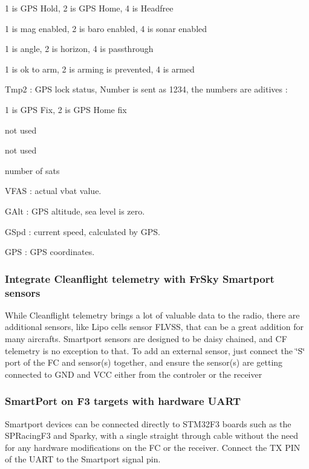 \begin{DoxyEnumerate}
\item 1 is G\+P\+S Hold, 2 is G\+P\+S Home, 4 is Headfree
\item 1 is mag enabled, 2 is baro enabled, 4 is sonar enabled
\item 1 is angle, 2 is horizon, 4 is passthrough
\item 1 is ok to arm, 2 is arming is prevented, 4 is armed
\end{DoxyEnumerate}

Tmp2 \+: G\+P\+S lock status, Number is sent as 1234, the numbers are aditives \+:


\begin{DoxyEnumerate}
\item 1 is G\+P\+S Fix, 2 is G\+P\+S Home fix
\item not used
\item not used
\item number of sats
\end{DoxyEnumerate}

V\+F\+A\+S \+: actual vbat value.

G\+Alt \+: G\+P\+S altitude, sea level is zero.

G\+Spd \+: current speed, calculated by G\+P\+S.

G\+P\+S \+: G\+P\+S coordinates.

\subsubsection*{Integrate Cleanflight telemetry with Fr\+Sky Smartport sensors}

While Cleanflight telemetry brings a lot of valuable data to the radio, there are additional sensors, like Lipo cells sensor F\+L\+V\+S\+S, that can be a great addition for many aircrafts. Smartport sensors are designed to be daisy chained, and C\+F telemetry is no exception to that. To add an external sensor, just connect the \char`\"{}\+S\char`\"{} port of the F\+C and sensor(s) together, and ensure the sensor(s) are getting connected to G\+N\+D and V\+C\+C either from the controler or the receiver



\subsubsection*{Smart\+Port on F3 targets with hardware U\+A\+R\+T}

Smartport devices can be connected directly to S\+T\+M32\+F3 boards such as the S\+P\+Racing\+F3 and Sparky, with a single straight through cable without the need for any hardware modifications on the F\+C or the receiver. Connect the T\+X P\+I\+N of the U\+A\+R\+T to the Smartport signal pin.

